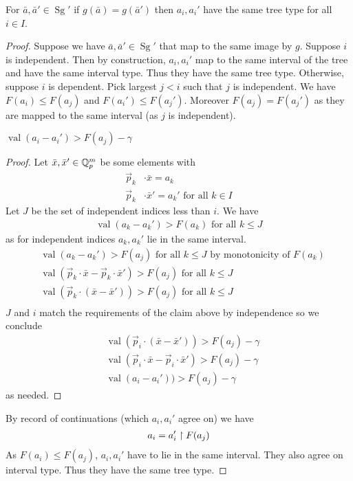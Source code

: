 \documentclass{amsart}
\DeclareMathOperator{\Sg}{Sg}
\DeclareMathOperator{\val}{val}
\begin{document}
\begin{Lemma}
	For $\bar a, \bar a' \in \Sg'$ if $g(\bar a) = g(\bar a')$ then $a_i, a_i'$ have the same tree type for all $i \in I$.	
\end{Lemma}

\begin{proof}
	Suppose we have $\bar a, \bar a' \in \Sg'$ that map to the same image by $g$.
	Suppose $i$ is independent.
	Then by construction, $a_i, a_i'$ map to the same interval of the tree and have the same interval type.
	Thus they have the same tree type.
	Otherwise, suppose $i$ is dependent.
	Pick largest $j < i$ such that $j$ is independent.
	We have $F(a_i) \leq F(a_j)$ and $F(a_i') \leq F(a_j')$.
	Moreover $F(a_j) = F(a_j')$ as they are mapped to the same interval (as $j$ is independent).
	
	\begin{Claim}
		$\val(a_i - a_i') > F(a_j) - \gamma$
	\end{Claim}
	\begin{proof}
		Let $\bar x, \bar x' \in \mathbb{Q}_p^m$ be some elements with
		\begin{align*}
			\vec p_k &\cdot \bar x = a_k \\
			\vec p_k &\cdot \bar x' = a_k' \text { for all } k \in I
		\end{align*}
		Let $J$ be the set of independent indices less than $i$.
		We have 
		\begin{align*}
			\val(a_k - a_k') > F(a_k) \text { for all } k \leq J
		\end{align*}
		as for independent indices $a_k, a_k'$ lie in the same interval.
		\begin{align*}
			&\val(a_k - a_k') > F(a_j) \text { for all } k \leq J \text{ by monotonicity of $F(a_k)$} \\
			&\val(\vec p_k \cdot \bar x - \vec p_k \cdot \bar x') > F(a_j) \text { for all } k \leq J \\
			&\val(\vec p_k \cdot (\bar x - \bar x')) > F(a_j) \text { for all } k \leq J \\
		\end{align*}
		$J$ and $i$ match the requirements of the claim above by independence so we conclude
		\begin{align*}
			&\val(\vec p_i \cdot (\bar x - \bar x')) > F(a_j) - \gamma \\
			&\val(\vec p_i \cdot \bar x - \vec p_i \cdot \bar x') > F(a_j) - \gamma \\
			&\val(a_i - a_i')) > F(a_j) - \gamma
		\end{align*}
		as needed.
	\end{proof}
	
	By record of continuations (which $a_i, a_i'$ agree on) we have
	\begin{align*}
		a_i = a_i' \upharpoonright F(a_j)
	\end{align*}
	As $F(a_i) \leq F(a_j)$, $a_i, a_i'$ have to lie in the same interval.
	They also agree on interval type.
	Thus they have the same tree type.
	
\end{proof}
\end{document}
